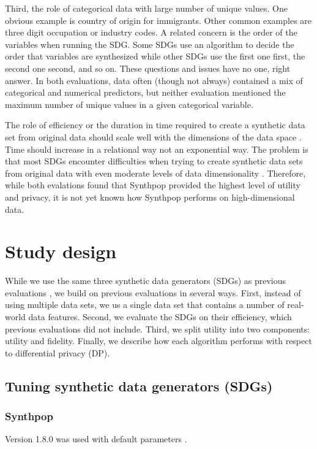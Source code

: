 \documentclass[runningheads]{llncs}
\begin{document}
Third, the role of categorical data with large number of unique values.  One obvious example is country of origin for immigrants.  Other common examples are three digit occupation or industry codes.  A related concern is the order of the variables when running the SDG.  Some SDGs use an algorithm to decide the order that variables are synthesized while other SDGs use the first one first, the second one second, and so on.  These questions and issues have no one, right answer.  In both evaluations, data often (though not always) contained a mix of categorical and numerical predictors, but neither evaluation mentioned the maximum number of unique values in a given categorical variable.  

The role of efficiency or the duration in time required to create a synthetic data set from original data should scale well with the dimensions of the data space \cite{jordon2022synthetic}.  Time should increase in a relational way not an exponential way.  The problem is that most SDGs encounter difficulties when trying to create synthetic data sets from original data with even moderate levels of data dimensionality \cite{zhang2017privbayes}.  Therefore, while both evalations found that Synthpop provided the highest level of utility and privacy, it is not yet known how Synthpop performs on high-dimensional data.

\section{Study design}\label{sec:study_design}

While we use the same three synthetic data generators (SDGs) as previous evaluations \cite{dankar2021fake,little2022comparing}, we build on previous evaluations in several ways.  First, instead of using multiple data sets, we us a single data set that contains a number of real-world data features.  Second, we evaluate the SDGs on their efficiency, which previous evaluations did not include.  Third, we split utility into two components: utility and fidelity.  Finally, we describe how each algorithm performs with respect to differential privacy (DP).  

\subsection{Tuning synthetic data generators (SDGs)}

\subsubsection{Synthpop} Version 1.8.0 was used with default parameters \cite{nowok2016synthpop}. 
\end{document}
